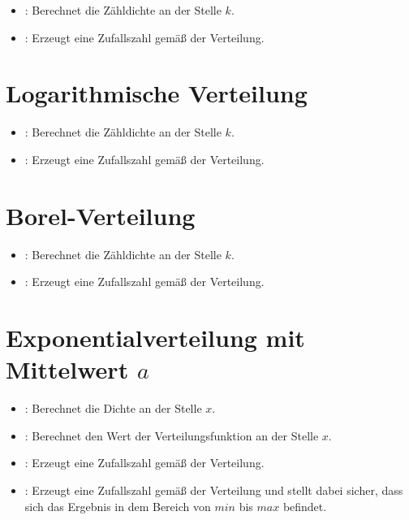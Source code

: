 \begin{itemize}

\item
{}:
Berechnet die Zähldichte an der Stelle $k$.

\item
{}:
Erzeugt eine Zufallszahl gemäß der Verteilung.

\end{itemize}



\section{Logarithmische Verteilung}

\begin{itemize}

\item
{}:
Berechnet die Zähldichte an der Stelle $k$.


\item
{}:
Erzeugt eine Zufallszahl gemäß der Verteilung.

\end{itemize}



\section{Borel-Verteilung}

\begin{itemize}

\item
{}:
Berechnet die Zähldichte an der Stelle $k$.


\item
{}:
Erzeugt eine Zufallszahl gemäß der Verteilung.

\end{itemize}



\section{Exponentialverteilung mit Mittelwert \texorpdfstring{$a$}{a}}

\begin{itemize}

\item
{}:
Berechnet die Dichte an der Stelle $x$.

\item
{}:
Berechnet den Wert der Verteilungsfunktion an der Stelle $x$.

\item
{}:
Erzeugt eine Zufallszahl gemäß der Verteilung.

\item
{}:
Erzeugt eine Zufallszahl gemäß der Verteilung und stellt dabei sicher, dass sich das Ergebnis in dem Bereich von $min$ bis $max$ befindet.

\end{itemize}



